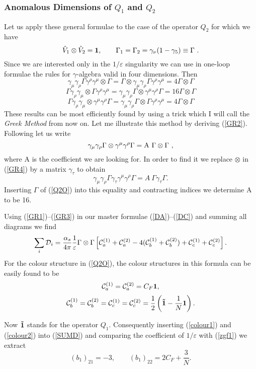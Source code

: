\documentclass[12pt]{article}
\def\as{\alpha_s}
\newcommand{\be}{\begin{equation}}
\newcommand{\ee}{\end{equation}}
\begin{document}
\begin{itemize}
\begin{itemize}
\begin{itemize}
\subsubsection{Anomalous Dimensions of $Q_1$ and $Q_2$}
Let us apply these general formulae to the case of the operator
$Q_2$ for which we have
\be\label{Q2O}
\hat V_1\otimes\hat V_2 ={\bf 1},\quad\quad
\Gamma_1=\Gamma_2=\gamma_\nu(1-\gamma_5)\equiv\Gamma~.
\ee
Since we are interested only in the $1/\varepsilon$ singularity
we can use in one-loop formulae the rules for $\gamma$-algebra
valid in four dimensions.
Then
\be\label{GR1}
\gamma_\mu\gamma_\rho\Gamma\gamma^\rho\gamma^\mu \otimes \Gamma
=\Gamma\otimes\gamma_\mu\gamma_\rho\Gamma\gamma^\rho\gamma^\mu 
=4 \Gamma\otimes\Gamma
\ee
\be\label{GR2}
\Gamma\gamma_\rho\gamma_\mu\otimes\Gamma\gamma^\rho\gamma^\mu 
=\gamma_\mu\gamma_\rho\Gamma\otimes\gamma^\mu\gamma^\rho\Gamma 
=16 \Gamma\otimes\Gamma
\ee
\be\label{GR3}
\Gamma\gamma_\rho\gamma_\mu\otimes\gamma^\mu\gamma^\rho\Gamma 
=\gamma_\mu\gamma_\rho\Gamma\otimes\Gamma\gamma^\rho\gamma^\mu 
=4 \Gamma\otimes\Gamma
\ee
These results can be most efficiently found by using a trick which
I will call the {\it Greek Method} \cite{GREEK} from now on.
Let me illustrate this method by 
deriving (\ref{GR2}). Following \cite{GREEK} let us write
\be\label{GR4}
\gamma_\mu\gamma_\rho\Gamma\otimes\gamma^\mu\gamma^\rho\Gamma =
{\rm A}~\Gamma\otimes\Gamma~,
\ee
where A is the coefficient we are looking for.
In order to find it we replace $\otimes$ in (\ref{GR4})
by a matrix $\gamma_\tau$ to obtain
\be\label{GR5}
\gamma_\mu\gamma_\rho\Gamma\gamma_\tau\gamma^\mu\gamma^\rho\Gamma =
A~\Gamma\gamma_\tau\Gamma.
\ee 
Inserting $\Gamma$ of (\ref{Q2O}) into this equality and contracting
indices we determine A to be 16.

Using (\ref{GR1})--(\ref{GR3}) in our master formulae 
(\ref{DA})--(\ref{DC}) and summing all diagrams we find
\be\label{SUMD}
\sum_i {\cal D}_i=\frac{\as}{4\pi} \frac{1}{\varepsilon}
\Gamma\otimes\Gamma
\left[{\cal C}_a^{(1)}+{\cal C}_a^{(2)}-
4 ({\cal C}_b^{(1)}+{\cal C}_b^{(2)})+
{\cal C}_c^{(1)}+{\cal C}_c^{(2)}\right].
\ee
For the colour structure in (\ref{Q2O}), the colour structures in this formula
can be easily found to be 
\be\label{colour1}
{\cal C}_a^{(1)}={\cal C}_a^{(2)}=C_F {\bf 1},
\ee
\be\label{colour2}
{\cal C}_b^{(1)}={\cal C}_b^{(2)}={\cal C}_c^{(1)}={\cal C}_c^{(2)}
=\frac{1}{2}\left({\bf \tilde 1}-\frac{1}{N}{\bf 1}\right).
\ee

Now ${\bf\tilde 1}$ stands for the operator $Q_1$. Consequently
inserting (\ref{colour1}) and (\ref{colour2}) into (\ref{SUMD})
and comparing the coefficient of $1/\varepsilon$ with (\ref{zgf1})
we extract
\be\label{b22a}
(b_1)_{21}=-3,
\quad\quad
(b_1)_{22}=2 C_F+\frac{3}{N}.
\ee


\end{itemize}
\end{itemize}
\end{itemize}
\end{document}
